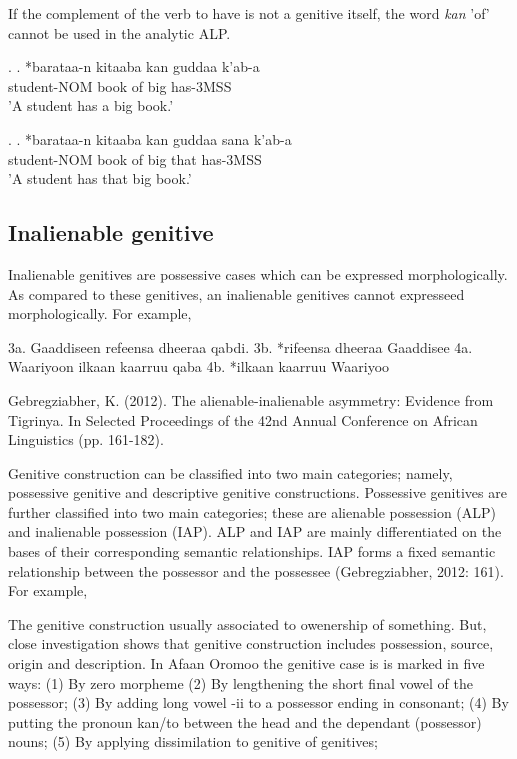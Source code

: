 \documentclass[11pt,a4paper]{article}
\begin{document}
	If the complement of the verb to have is not a genitive itself, the word \emph{kan} 'of' cannot be used in the analytic ALP.
	
	\ex.
	\ag.
	*barataa-n kitaaba kan guddaa k'ab-a\\
	student-NOM book of big has-3MSS\\
	'A student has a big book.'
	
	\ex.
	\ag.
	*barataa-n kitaaba kan guddaa sana k'ab-a\\
	student-NOM book of big that has-3MSS\\
	'A student has that big book.'
	
	
	\subsection{Inalienable genitive}
	
	Inalienable genitives are possessive cases which can be expressed morphologically. As compared to these genitives, an inalienable genitives cannot 
	expresseed morphologically. For example,
	
	3a. Gaaddiseen refeensa dheeraa qabdi.
	3b. *rifeensa dheeraa Gaaddisee
	4a. Waariyoon ilkaan kaarruu qaba
	4b. *ilkaan kaarruu Waariyoo
	
	Gebregziabher, K. (2012). The alienable-inalienable asymmetry: Evidence from Tigrinya. 
	In Selected Proceedings of the 42nd Annual Conference on African Linguistics (pp. 161-182).
	
	Genitive construction can be classified into two main categories; namely, possessive genitive and descriptive
	genitive constructions. Possessive genitives are further classified into two main categories; these are alienable possession (ALP)
	and inalienable possession (IAP). ALP and IAP are mainly differentiated on the bases 
	of their corresponding semantic relationships. IAP forms a fixed semantic relationship between the possessor and the 
	possessee (Gebregziabher, 2012: 161). For example,
	
	The genitive construction usually associated to owenership of something. But, close investigation shows that
	genitive construction includes possession, source, origin and description. In Afaan Oromoo the genitive case is 
	is marked in five ways: 
	(1) By zero morpheme 
	(2) By lengthening the short final vowel of the possessor;  
	(3) By adding long vowel -ii to a possessor ending in consonant;  
	(4) By putting the pronoun kan/to between the head and the dependant (possessor) nouns;   
	(5) By applying dissimilation to genitive of genitives;
	
\end{document}
